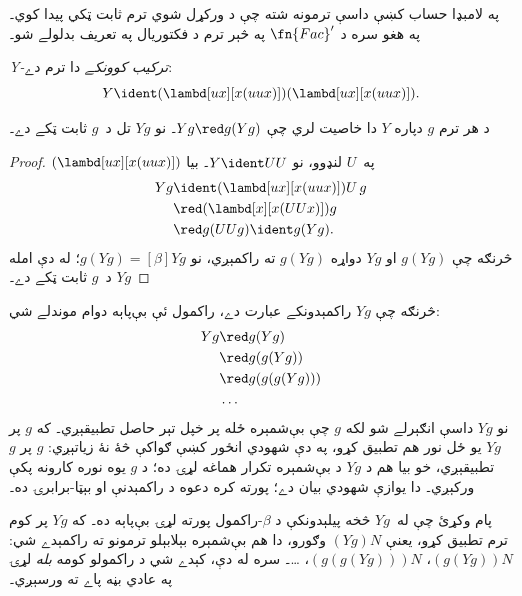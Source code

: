 \documentclass[../../../include/open-logic-section]{subfiles}
\begin{document}
په لامبډا حساب کښې داسې ترمونه شته چې د ورکړل شوي
ترم ثابت ټکي پيدا کوي۔ په هغو سره د $\fn{Fac}'$ په
څېر ترم د فکتوريال په تعريف بدلولے شو۔

\begin{defn}
  \emph{Y-ترکيب کوونکے} دا ترم دے:
  \[
  Y \ident (\lambd[ux][x(uux)])(\lambd[ux][x(uux)]).
  \]
\end{defn}

\begin{thm}
  د هر ترم $g$ دپاره $Y$ دا خاصيت لري چې $Yg \red g(Yg)$۔
  نو $Yg$ تل د~$g$ ثابت ټکے دے۔
\end{thm}

\begin{proof}
  $(\lambd[ux][x(uux)])$ په~$U$ لنډوو، نو $Y \ident UU$۔ بيا
  \begin{align*}
    Y g &\ident (\lambd[ux][x(uux)])U\,g \\
    &\red (\lambd[x][x(UUx)])g\\
    & \red g(UUg) \ident g(Yg).
  \end{align*}
  څرنګه چې $g(Yg)$ او $Yg$ دواړه $g(Yg)$ ته
  راکمېږي، نو $g(Yg) \equal[\beta] Yg$؛ له دې امله
  $Yg$ د~$g$ ثابت ټکے دے۔
\end{proof}

څرنګه چې $Yg$ راکمېدونکے عبارت دے، راکمول ئې
بې‌پاېه دوام موندلے شي:
\begin{align*}
  Y g &\red g (Y g) \\
    &\red g (g (Y g)) \\
    &\red g(g (g (Y g)))\\
    &\ldots
\end{align*}
نو $Yg$ داسې انګېرلے شو لکه $g$ چې بې‌شمېره ځله
پر خپل تېر حاصل تطبيقېږي۔ که $g$ پر $Yg$ يو ځل
نور هم تطبيق کړو، په دې شهودي انځور کښې ګواکې
څۀ نۀ زياتېږي: $g$ پر $g$ تطبيقېږي، خو بيا هم
د $Yg$ د بې‌شمېره تکرار هماغه لړۍ ده؛ د $g$ يوه
نوره کارونه پکې ورکېږي۔ دا يوازې شهودي بيان دے؛
پورته کره دعوه د راکمېدنې او بېټا-برابرۍ ده۔

پام وکړئ چې له~$Yg$ څخه پيلېدونکې د $\beta$-راکمول
پورته لړۍ بې‌پاېه ده۔ که $Yg$ پر کوم ترم تطبيق کړو،
يعنې $(Yg)N$ وګورو، دا هم بې‌شمېره بېلابېلو ترمونو
ته راکمېدے شي: $(g(Yg))N$، $(g(g(Yg)))N$، \dots۔
سره له دې، کېدے شي د راکمولو کومه \emph{بله} لړۍ
په عادي بڼه پاے ته ورسېږي۔
\end{document}
